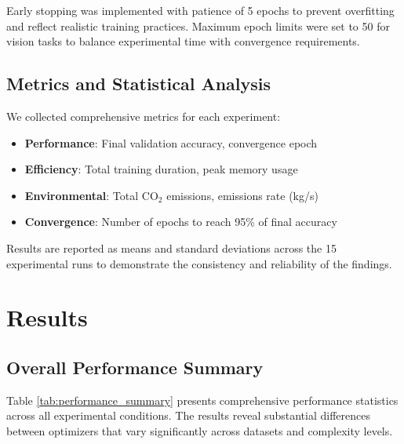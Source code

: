 \documentclass[conference]{IEEEtran}
\begin{document}
Early stopping was implemented with patience of 5 epochs to prevent overfitting and reflect realistic training practices. Maximum epoch limits were set to 50 for vision tasks to balance experimental time with convergence requirements.

\subsection{Metrics and Statistical Analysis}

We collected comprehensive metrics for each experiment:

\begin{itemize}
    \item \textbf{Performance}: Final validation accuracy, convergence epoch
    \item \textbf{Efficiency}: Total training duration, peak memory usage
    \item \textbf{Environmental}: Total CO$_2$ emissions, emissions rate (kg/s)
    \item \textbf{Convergence}: Number of epochs to reach 95\% of final accuracy
\end{itemize}

Results are reported as means and standard deviations across the 15 experimental runs to demonstrate the consistency and reliability of the findings.

\section{Results}

\subsection{Overall Performance Summary}

Table \ref{tab:performance_summary} presents comprehensive performance statistics across all experimental conditions. The results reveal substantial differences between optimizers that vary significantly across datasets and complexity levels.
\end{document}
